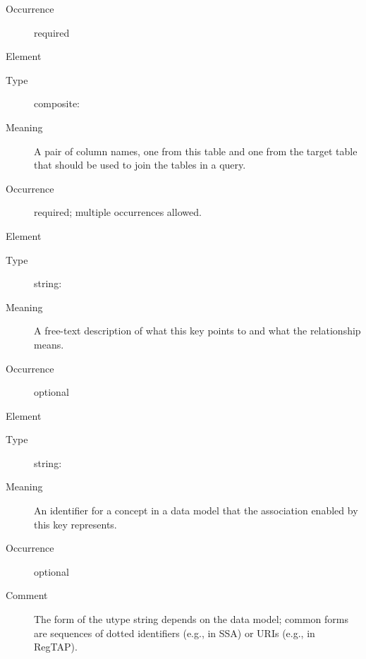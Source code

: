\documentclass[11pt,a4paper]{ivoa}
\begin{document}
\begin{generated}
\begin{bigdescription}
\begin{description}
\item[Occurrence] required

\end{description}
\item[Element \xmlel{fkColumn}]
\begin{description}
\item[Type] composite: 
\item[Meaning] 
               A pair of column names, one from this table and one
               from the target table that should be used to join the
               tables in a query.  
             
\item[Occurrence] required; multiple occurrences allowed.

\end{description}
\item[Element \xmlel{description}]
\begin{description}
\item[Type] string: 
\item[Meaning] 
                  A free-text description of what this key points to
                  and what the relationship means.  
               
\item[Occurrence] optional

\end{description}
\item[Element \xmlel{utype}]
\begin{description}
\item[Type] string: 
\item[Meaning] 
                  An identifier for a concept in a data model that
                  the association enabled by this key represents.  
               
\item[Occurrence] optional
\item[Comment] 
                  The form of the utype string depends on the data
                  model; common forms are sequences of dotted identifiers
                  (e.g., in SSA) or URIs (e.g., in RegTAP).
               

\end{description}


\end{bigdescription}\endgroup

\endgroup
\end{generated}
\end{document}
